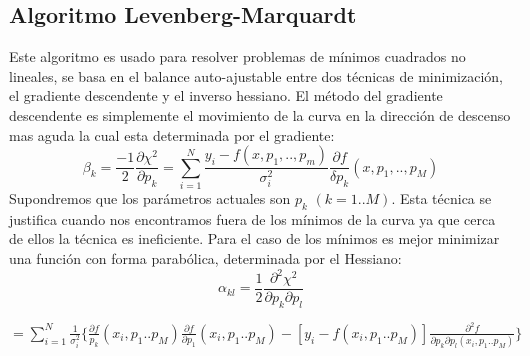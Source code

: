 \documentclass[a4paper,openright,12pt]{book}
\begin{document}
\subsection{Algoritmo Levenberg-Marquardt}
Este algoritmo es usado para resolver problemas de mínimos cuadrados no lineales, se basa en el balance auto-ajustable entre dos técnicas de minimización, el gradiente descendente y el inverso hessiano. El método del gradiente descendente es simplemente el movimiento de la curva en la dirección de descenso mas aguda la cual esta determinada por el gradiente:\\
\begin{equation}
\beta_{k}=\frac{-1}{2}\frac{\partial\chi^{2}}{\partial p_{k}}=\sum_{i=1}^{N}\frac{y_{i}-f(x,p_{1},..,p_{m})}{\sigma_{i}^{2}}\frac{\partial f}{\delta p_{k}}(x,p_{1},..,p_{M})
\end{equation}
Supondremos que los parámetros actuales son $p_{k}$ $(k=1..M)$.  Esta técnica se justifica cuando nos encontramos fuera de los mínimos de la curva ya que cerca de ellos la técnica es ineficiente. 
Para el caso de los mínimos  es mejor minimizar una función con forma parabólica, determinada por el Hessiano:
\begin{equation}
\alpha_{kl}=
\frac{1}{2}\frac{\partial^{2}\chi^{2}}{\partial p_{k}\partial p_{l}
}
\end{equation}
\begin{large}
\begin{center}
$
=\sum_{i=1}^{N}\frac{1}{\sigma_{i}^{2}}\{\frac{\partial f}{p_{k}}(x_{i},p_1..p_{M})\frac{\partial f}{\partial p_{1}}(x_{i},p_{1}..p_{M})-[y_{i}-f(x_{i},p_{1}..p_{M})]\frac{\partial^{2}f}{\partial p_{k}\partial p_{l}(x_{i},p_{1}..p_{M})}\}
$
\end{center}
\end{large}
\end{document}
